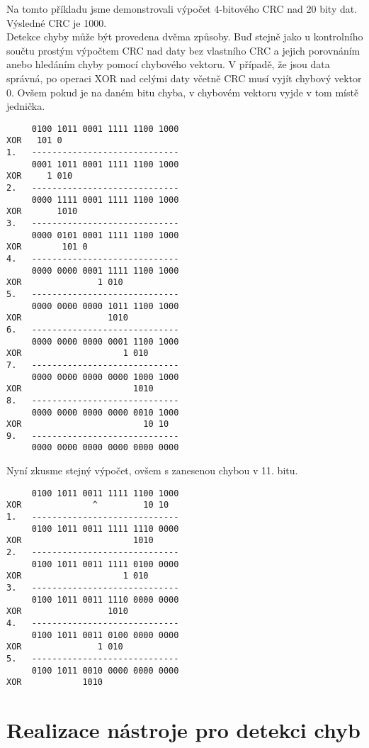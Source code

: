 Na tomto příkladu jsme demonstrovali výpočet 4-bitového CRC nad 20 bity dat. Výsledné CRC je 1000.\\
Detekce chyby může být provedena dvěma způsoby. Buď stejně jako u kontrolního součtu prostým výpočtem CRC nad daty bez vlastního CRC a jejich porovnáním anebo hledáním chyby pomocí chybového vektoru. V případě, že jsou data správná, po operaci XOR nad celými daty včetně CRC musí vyjít chybový vektor 0. Ovšem pokud je na daném bitu chyba, v chybovém vektoru vyjde v tom místě jednička.\\
\begin{verbatim}
     0100 1011 0001 1111 1100 1000
XOR   101 0
1.   -----------------------------
     0001 1011 0001 1111 1100 1000
XOR     1 010
2.   -----------------------------
     0000 1111 0001 1111 1100 1000
XOR       1010
3.   -----------------------------
     0000 0101 0001 1111 1100 1000
XOR        101 0
4.   -----------------------------
     0000 0000 0001 1111 1100 1000
XOR               1 010
5.   -----------------------------
     0000 0000 0000 1011 1100 1000
XOR                 1010 
6.   -----------------------------
     0000 0000 0000 0001 1100 1000
XOR                    1 010
7.   -----------------------------
     0000 0000 0000 0000 1000 1000
XOR                      1010
8.   -----------------------------
     0000 0000 0000 0000 0010 1000
XOR                        10 10
9.   -----------------------------
     0000 0000 0000 0000 0000 0000
\end{verbatim}
Nyní zkusme stejný výpočet, ovšem s zanesenou chybou v 11. bitu.
\begin{verbatim}
     0100 1011 0011 1111 1100 1000
XOR              ^         10 10
1.   -----------------------------
     0100 1011 0011 1111 1110 0000
XOR                      1010
2.   -----------------------------
     0100 1011 0011 1111 0100 0000
XOR                    1 010
3.   -----------------------------
     0100 1011 0011 1110 0000 0000
XOR                 1010
4.   -----------------------------
     0100 1011 0011 0100 0000 0000
XOR               1 010
5.   -----------------------------
     0100 1011 0010 0000 0000 0000
XOR            1010
\end{verbatim}
\chapter{Realizace nástroje pro detekci chyb}
